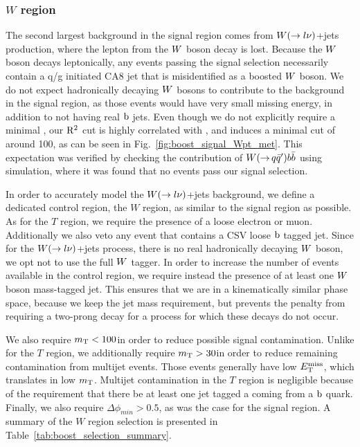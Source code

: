 

\subsubsection{\texorpdfstring{$W$}{W} region}

The second largest background in the signal region comes from $W(\rightarrow l\nu)$+jets
production, where the lepton from the $W$ boson decay is lost.
Because the $W$ boson decays leptonically, any events passing the signal selection necessarily
contain a q/g initiated CA8 jet that is misidentified as a boosted $W$ boson. 
We do not expect hadronically decaying $W$ bosons to contribute to the background in the signal
region, as those events would have very small missing energy, in addition to not having real
$\mathrm{b}$ jets. Even though we do not explicitly require a minimal \ETm, our $\mathrm{R^2}$ cut is highly
correlated with \ETm, and induces a minimal cut of around 100\GeV, as can be seen in
Fig.~\ref{fig:boost_signal_Wpt_met}. 
This expectation was verified by checking the contribution of $W({\rightarrow}\,
q\bar{q}')b\bar{b}$ using simulation, where it was found that no events pass our signal
selection. 

In order to accurately model the $W(\rightarrow l\nu)$+jets background, we define a dedicated
control region, the $W$ region, as similar to the signal region as possible. As for the $T$ region,
we require the presence of a loose electron or muon. Additionally we also veto any event that
contains a CSV loose $\mathrm{b}$ tagged jet.  
Since for the $W(\rightarrow l\nu)$+jets process, there is no real hadronically decaying $W$
boson, we opt not to use the full $W$ tagger. 
In order to increase the number of events available in the control region, we require instead the
presence of at least one $W$ boson mass-tagged jet. This ensures that we are in a kinematically
similar phase space, because we keep the jet mass requirement, but prevents the penalty from
requiring a two-prong decay for a process for which these decays do not occur. 

We also require $m_{\mathrm{T}} < 100$\GeV in order to reduce possible signal contamination. Unlike for the $T$
region, we additionally require $m_{\mathrm{T}} > 30$\GeV in order to reduce remaining contamination from
multijet events. Those events generally have low $E_{\mathrm{T}}^{\text{miss}}$, which translates in low $m_{\mathrm{T}}$. 
Multijet contamination in the $T$ region is negligible because of the
requirement that there be at least one jet tagged a coming from a $\mathrm{b}$ quark. 
Finally, we also require $\Delta\phi_{min} > 0.5$, as was the case for the signal region. 
A summary of the $W$ region selection is presented in Table~\ref{tab:boost_selection_summary}.

